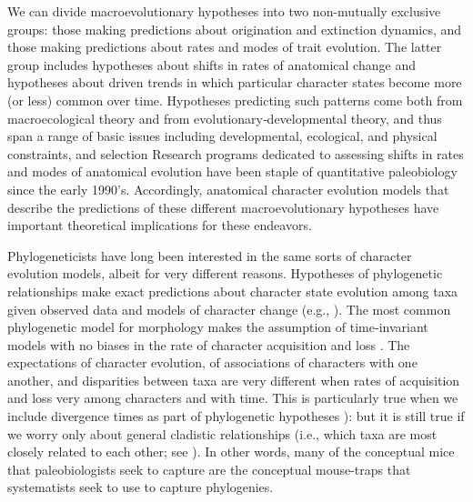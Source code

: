 \documentclass{article}
\begin{document}
We can divide macroevolutionary hypotheses into two non-mutually exclusive groups: those making predictions about origination and extinction dynamics, and those making predictions about rates and modes of trait evolution. 
The latter group includes hypotheses about shifts in rates of anatomical change and hypotheses about driven trends in which particular character states become more (or less) common over time.  
Hypotheses predicting such patterns come both from macroecological theory and from evolutionary‑developmental theory, and thus span a range of basic issues including developmental, ecological, and physical constraints, and selection  \citep{valentine1969patterns, valentine1980determinants}
Research programs dedicated to assessing shifts in rates and modes of anatomical evolution have been staple of quantitative paleobiology since the early 1990’s. 
Accordingly, anatomical character evolution models that describe the predictions of these different macroevolutionary hypotheses have important theoretical implications for these endeavors. 

Phylogeneticists have long been interested in the same sorts of character evolution models, albeit for very different reasons.  
Hypotheses of phylogenetic relationships make exact predictions about character state evolution among taxa given observed data and models of character change (e.g., \cite{Kimura1980, Felsenstein1981, Hasegawa1985, Tavare1986}).  
The most common phylogenetic model for morphology makes the assumption of time-invariant models with no biases in the rate of character acquisition and loss \citep{Lewis2001}.
The expectations of character evolution, of associations of characters with one another, and disparities between taxa are very different when rates of acquisition and loss very among characters and with time.
This is particularly true when we include divergence times as part of phylogenetic hypotheses \citep{Huelsenbeck2000a, Sanderson2002, Drummond2006}): but it is still true if we worry only about general cladistic relationships (i.e., which taxa are most closely related to each other; see \cite{Felsenstein1981, Nylander2004, Wright2016}).  
In other words, many of the conceptual mice that paleobiologists seek to capture are the conceptual mouse-traps that systematists seek to use to capture phylogenies.  
\end{document}
